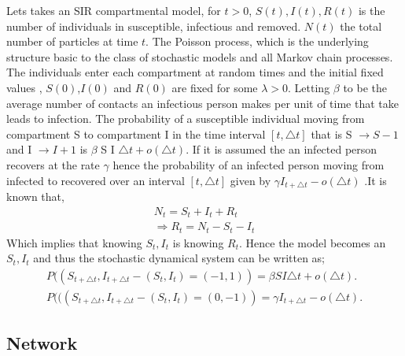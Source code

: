  Lets takes an SIR compartmental model, for $t > 0$, $S(t),I(t),R(t)$ is the number of individuals in susceptible, infectious and removed. $N(t)$ the total number of particles at time $t$. The Poisson process, which is the underlying structure basic to the class of stochastic models and all Markov chain processes\citep{greenwood2009stochastic}. 
The individuals enter each compartment at random times 
and the initial fixed values , $S(0)$,$I(0)$ and $R(0)$ are fixed for some $\lambda > 0$. 
Letting $\beta$ to be the average number of  contacts an infectious person makes per unit of time that take leads to infection. The probability of a susceptible individual moving from compartment S to compartment I in the time interval $\left[ t,\triangle t \right]$ that is  S $\rightarrow S-1$ and I $\rightarrow I + 1 $ is $ \beta$ S I $ \triangle t + o (\triangle t)$. If it is assumed the an infected person recovers at the rate $\gamma$ hence the probability of an infected person moving from infected to recovered over an interval $\left[ t,\triangle t \right]$  given by $\gamma I_{t + \triangle t} -o (\triangle t)$ .It is known that,
 \begin{align*}
 N_t = S_t + I_t + R_t
 \\ \Rightarrow  R_t = N_t - S_t - I_t
\end{align*}  
Which implies that knowing $S_t,I_t$ is knowing $R_t$. Hence the model becomes an $S_t,I_t$ and thus the stochastic dynamical system can be written as;
 \begin{align}
 P((S_{t + \triangle t}, I_{t + \triangle t} - (S_t ,I_t) = ( - 1,1)) =  \beta S I  \triangle t + o (\triangle t).
 \\ P (((S_{t + \triangle t}, I_{t + \triangle t} - (S_t ,I_t) = ( 0,-1)) = \gamma I_{t + \triangle t} -o (\triangle t).
 \end{align}
\subsection{Network}


